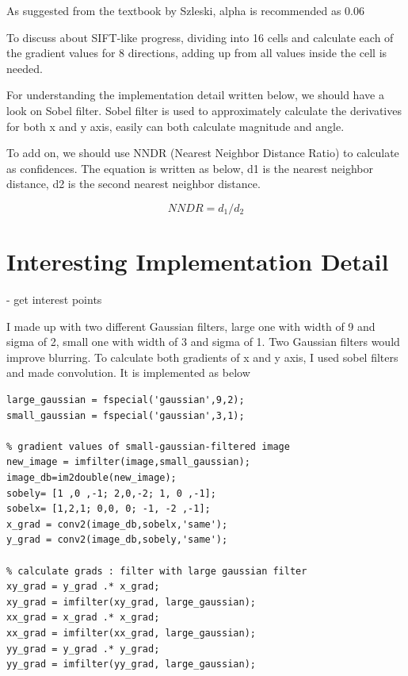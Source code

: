 As suggested from the textbook by Szleski, alpha is recommended as 0.06


To discuss about SIFT-like progress, dividing into 16 cells and calculate each of the gradient values for 8 directions, adding up from all values inside the cell is needed. 

For understanding the implementation detail written below, we should have a look on Sobel filter. Sobel filter is used to approximately calculate the derivatives for both x and y axis, easily can both calculate magnitude and angle.

To add on, we should use NNDR (Nearest Neighbor Distance Ratio) to calculate as confidences. The equation \label{eq:three} is written as below, d1 is the nearest neighbor distance, d2 is the second nearest neighbor distance. 

\begin{equation}
NNDR = d_1 / d_2
\label{eq:three}
\end{equation}

\section*{Interesting Implementation Detail}

- get interest points


I made up with two different Gaussian filters, large one with width of 9 and sigma of 2, small one with width of 3 and sigma of 1. Two Gaussian filters would improve blurring. To calculate both gradients of x and y axis, I used sobel filters and made convolution. It is implemented as below

\begin{lstlisting}[style=Matlab-editor]
% small, large gaussian filter -> sigma 2, 1 for each large, small filter
large_gaussian = fspecial('gaussian',9,2);
small_gaussian = fspecial('gaussian',3,1);

% gradient values of small-gaussian-filtered image
new_image = imfilter(image,small_gaussian);
image_db=im2double(new_image);
sobely= [1 ,0 ,-1; 2,0,-2; 1, 0 ,-1];
sobelx= [1,2,1; 0,0, 0; -1, -2 ,-1];
x_grad = conv2(image_db,sobelx,'same');
y_grad = conv2(image_db,sobely,'same');

% calculate grads : filter with large gaussian filter 
xy_grad = y_grad .* x_grad;
xy_grad = imfilter(xy_grad, large_gaussian); 
xx_grad = x_grad .* x_grad; 
xx_grad = imfilter(xx_grad, large_gaussian); 
yy_grad = y_grad .* y_grad;
yy_grad = imfilter(yy_grad, large_gaussian); 

\end{lstlisting}

